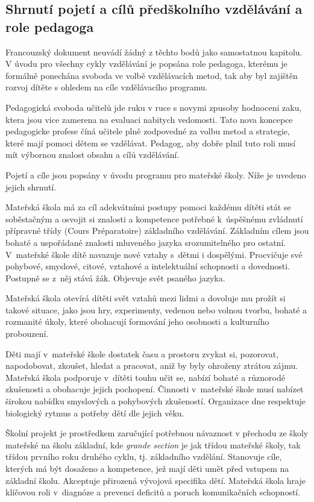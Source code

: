 \subsection{Shrnutí pojetí a cílů předškolního vzdělávání a role pedagoga}

	Francouzský dokument neuvádí žádný z těchto bodů jako samostatnou kapitolu. V úvodu pro všechny cykly vzdělávání je popsána role pedagoga, kterému je formálně ponechána svoboda ve volbě vzdělávacích metod, tak aby byl zajištěn rozvoj dítěte s ohledem na cíle vzdělávacího programu.

	Pedagogická svoboda učitelů jde ruku v ruce s novymi zpusoby hodnoceni zaku, ktera jsou vice zamerena na evaluaci nabitych vedomosti. Tato nova koncepce pedagogicke profese číná učitele  plně zodpovedné za volbu metod a strategie, které mají pomoci dětem se vzdělávat. Pedagog, aby dobře plnil tuto roli musí mít výbornou znalost obsahu a cílů vzdělávání.

	Pojetí a cíle jsou popsány v úvodu programu pro mateřské školy. Níže je uvedeno jejich shrnutí.

	Mateřská škola má za cíl adekvátními postupy pomoci každému dítěti stát se soběstačným a osvojit si znalosti a kompetence potřebné k úspěšnému zvládnutí přípravné třídy (Cours Préparatoire) základního vzdělávání. Základním cílem jsou bohaté a uspořádané znalosti mluveného jazyka srozumitelného pro ostatní. V mateřské škole dítě navazuje nové vztahy s dětmi i dospělými. Procvičuje své pohybové, smyslové, citové, vztahové a intelektuální schopnosti a dovednosti. Postupně se z něj stává žák. Objevuje svět psaného jazyka. 

	Mateřská škola otevírá dítěti svět vztahů mezi lidmi a dovoluje mu prožít si takové situace, jako jsou hry, experimenty, vedenou nebo volnou tvorbu, bohaté a rozmanité úkoly, které obohacují formování jeho osobnosti a kulturního probouzení. 

	Děti mají v mateřské škole dostatek času a prostoru zvykat si, pozorovat, napodobovat, zkoušet, hledat a pracovat, aniž by byly ohroženy ztrátou zájmu. Mateřská škola podporuje v dítěti touhu učit se, nabízí bohaté a různorodé zkušenosti a obohacuje jejich pochopení. 
	Činnosti v mateřské škole musí nabízet širokou nabídku smyslových a pohybových zkušeností. Organizace dne respektuje biologický rytmus a potřeby dětí dle jejich věku. 

	Školní projekt je prostředkem zaručující potřebnou návaznost v přechodu ze školy mateřské na školu základní, kde \textit{grande section} je jak třídou mateřské školy, tak třídou prvního roku druhého cyklu, tj. základního vzdělání. Stanovuje cíle, kterých má být dosaženo a kompetence, jež mají děti umět před vstupem na základní školu. Akceptuje přirozená vývojová specifika dětí. Mateřská škola hraje klíčovou roli v diagnóze a prevenci deficitů a poruch komunikačních schopností.

